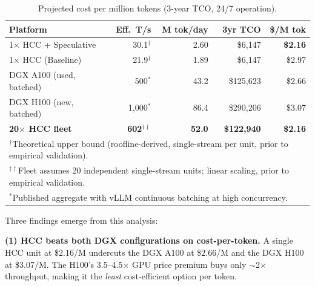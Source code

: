 \documentclass[11pt,a4paper]{article}
\begin{document}
\begin{table}[ht!]
\centering
\caption{Projected cost per million tokens (3-year TCO, 24/7 operation).\protect\footnotemark}
\vspace{0.2cm}
\begin{tabular}{l r r r r}
\toprule
\textbf{Platform} & \textbf{Eff.\ T/s} & \textbf{M tok/day} & \textbf{3yr TCO} & \textbf{\$/M tok} \\
\midrule
1$\times$ HCC + Speculative & 30.1$^\dagger$ & 2.60 & \$6,147 & \textbf{\$2.16} \\
1$\times$ HCC (Baseline) & 21.9$^\dagger$ & 1.89 & \$6,147 & \$2.97 \\
DGX A100 (used, batched) & 500$^*$ & 43.2 & \$125,623 & \$2.66 \\
DGX H100 (new, batched) & 1,000$^*$ & 86.4 & \$290,206 & \$3.07 \\
\textbf{20$\times$ HCC fleet} & \textbf{602}$^{\dagger\dagger}$ & \textbf{52.0} & \textbf{\$122,940} & \textbf{\$2.16} \\
\bottomrule
\multicolumn{5}{l}{\footnotesize $^\dagger$Theoretical upper bound (roofline-derived, single-stream per unit, prior to empirical validation).}\\
\multicolumn{5}{l}{\footnotesize $^{\dagger\dagger}$Fleet assumes 20 independent single-stream units; linear scaling, prior to empirical validation.}\\
\multicolumn{5}{l}{\footnotesize $^*$Published aggregate with vLLM continuous batching at high concurrency.}
\end{tabular}
\label{tab:cost_per_token}
\end{table}

\noindent Three findings emerge from this analysis:

\textbf{(1) HCC beats both DGX configurations on cost-per-token.} A single HCC unit at \$2.16/M undercuts the DGX A100 at \$2.66/M and the DGX H100 at \$3.07/M. The H100's 3.5--4.5$\times$ GPU price premium buys only $\sim$2$\times$ throughput, making it the \textit{least} cost-efficient option per token.
\end{document}
